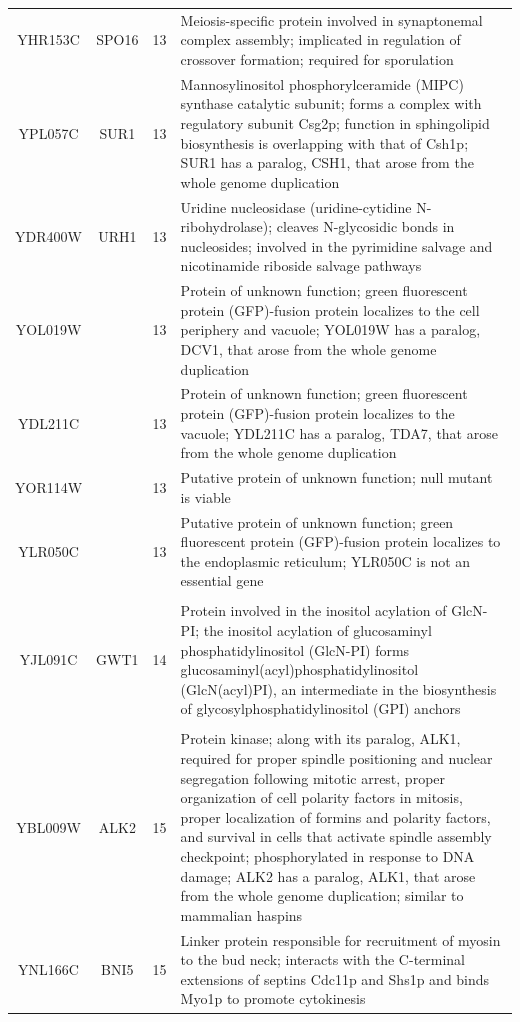 \documentclass[]{article}
\begin{document}
\begin{longtable}{@{\extracolsep{3pt}} cccp{85mm}}
YHR153C & SPO16 & 13 & Meiosis-specific protein involved in synaptonemal complex assembly; implicated in regulation of crossover formation; required for sporulation \\ 
YPL057C & SUR1 & 13 & Mannosylinositol phosphorylceramide (MIPC) synthase catalytic subunit; forms a complex with regulatory subunit Csg2p; function in sphingolipid biosynthesis is overlapping with that of Csh1p; SUR1 has a paralog, CSH1, that arose from the whole genome duplication \\ 
YDR400W & URH1 & 13 & Uridine nucleosidase (uridine-cytidine N-ribohydrolase); cleaves N-glycosidic bonds in nucleosides; involved in the pyrimidine salvage and nicotinamide riboside salvage pathways \\ 
YOL019W &  & 13 & Protein of unknown function; green fluorescent protein (GFP)-fusion protein localizes to the cell periphery and vacuole; YOL019W has a paralog, DCV1, that arose from the whole genome duplication \\ 
YDL211C &  & 13 & Protein of unknown function; green fluorescent protein (GFP)-fusion protein localizes to the vacuole; YDL211C has a paralog, TDA7, that arose from the whole genome duplication \\ 
YOR114W &  & 13 & Putative protein of unknown function; null mutant is viable \\ 
YLR050C &  & 13 & Putative protein of unknown function; green fluorescent protein (GFP)-fusion protein localizes to the endoplasmic reticulum; YLR050C is not an essential gene \\   \hline \\ [-1.8ex] 
YJL091C & GWT1 & 14 & Protein involved in the inositol acylation of GlcN-PI; the inositol acylation of glucosaminyl phosphatidylinositol (GlcN-PI) forms glucosaminyl(acyl)phosphatidylinositol (GlcN(acyl)PI), an intermediate in the biosynthesis of glycosylphosphatidylinositol (GPI) anchors \\   \hline \\ [-1.8ex] 
YBL009W & ALK2 & 15 & Protein kinase; along with its paralog, ALK1, required for proper spindle positioning and nuclear segregation following mitotic arrest, proper organization of cell polarity factors in mitosis, proper localization of formins and polarity factors, and survival in cells that activate spindle assembly checkpoint; phosphorylated in response to DNA damage; ALK2 has a paralog, ALK1, that arose from the whole genome duplication; similar to mammalian haspins \\ 
YNL166C & BNI5 & 15 & Linker protein responsible for recruitment of myosin to the bud neck; interacts with the C-terminal extensions of septins Cdc11p and Shs1p and binds Myo1p to promote cytokinesis \\ 

\end{longtable}
\end{document}
